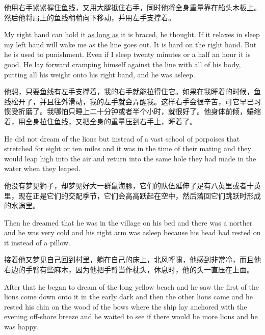 \begin{paracol}{2}
\switchcolumn

他用右手紧紧握住鱼线，又用大腿抵住右手，同时他将全身重量靠在船头木板上。然后他将肩上的鱼线稍稍向下移动，并用左手支撑着。

\switchcolumn*

My right hand can hold it \uline{as long as} it is braced, he thought. If it relaxes
in sleep my left hand will wake me as the line goes out. It is hard on the
right hand. But he is used to punishment. Even if I sleep twenty minutes or
a half an hour it is good. He lay forward cramping himself against the line
with all of his body, putting all his weight onto his right band, and he was
asleep.

\switchcolumn

他想，只要鱼线有左手支撑着，我的右手就能拉得住它。如果在我睡着的时候，鱼线松开了，并且往外滑动，我的左手就会弄醒我。这样右手会很辛苦，可它早已习惯受折磨了。我哪怕只睡上二十分钟或者半个小时，就很好了。他身体前倾，蜷缩着，用全身拉住鱼线，又把全身的重量压到右手上，睡着了。

\switchcolumn*

He did not dream of the lions but instead of a \gls{vast} school of
porpoises that \gls{stretched} for eight or ten miles and it was in the time of
their \gls{mating} and they would leap high into the air and return into the same
hole they had made in the water when they leaped.

\switchcolumn

他没有梦见狮子，却梦见好大一群鼠海豚，它们的队伍延伸了足有八英里或者十英里，现在正是它们的交配季节，它们会高高跃起在空中，然后落回它们跳跃时形成的水涡里。

\switchcolumn*

Then he dreamed that he was in the village on his bed and there was a
\gls{norther} and he was very cold and his right arm was asleep because his
head had rested on it instead of a pillow.

\switchcolumn

接着他又梦见自己回到村里，躺在自己的床上，北风呼啸，他感到非常冷，而且他右边的手臂有些麻木，因为他把手臂当作枕头，休息时，他的头一直压在上面。

\switchcolumn*

After that he began to dream of the long yellow beach and he saw the first
of the lions come down onto it in the early dark and then the other lions
came and he rested his chin on the wood of the bows where the ship lay
anchored with the evening off-shore breeze and he waited to see if there
would be more lions and he was happy.


\end{paracol}
